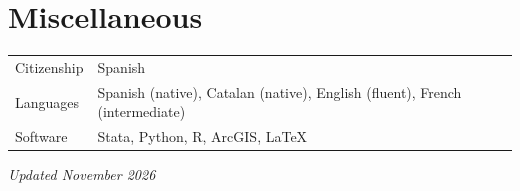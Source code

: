 \documentclass[11pt,a4paper]{article}
\begin{document}
\section*{Miscellaneous}

\begin{tabular}{@{}ll}
Citizenship & Spanish \\
Languages & Spanish (native), Catalan (native), English (fluent), French (intermediate) \\
Software & Stata, Python, R, ArcGIS, \LaTeX
\end{tabular}

\vspace{2em}
\begin{flushright}
    \textit{Updated November 2026}
\end{flushright}
\end{document}
